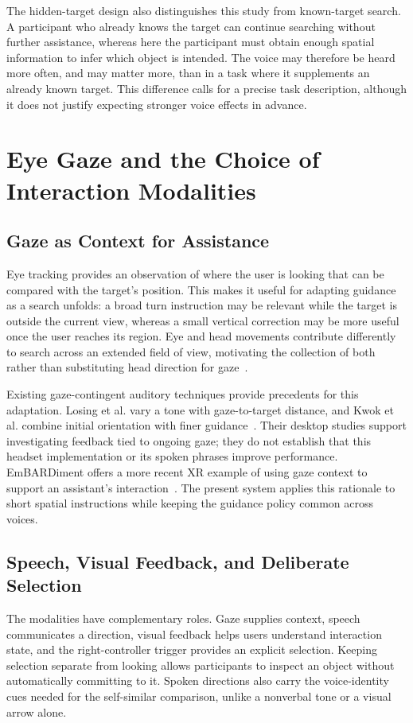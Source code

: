 The hidden-target design also distinguishes this study from known-target search. A participant who already knows the target can continue searching without further assistance, whereas here the participant must obtain enough spatial information to infer which object is intended. The voice may therefore be heard more often, and may matter more, than in a task where it supplements an already known target. This difference calls for a precise task description, although it does not justify expecting stronger voice effects in advance.

\section{Eye Gaze and the Choice of Interaction Modalities}
\subsection{Gaze as Context for Assistance}
Eye tracking provides an observation of where the user is looking that can be compared with the target's position. This makes it useful for adapting guidance as a search unfolds: a broad turn instruction may be relevant while the target is outside the current view, whereas a small vertical correction may be more useful once the user reaches its region. Eye and head movements contribute differently to search across an extended field of view, motivating the collection of both rather than substituting head direction for gaze~\cite{stein2024eyehead}.

Existing gaze-contingent auditory techniques provide precedents for this adaptation. Losing et al. vary a tone with gaze-to-target distance, and Kwok et al. combine initial orientation with finer guidance~\cite{losing2014guiding,kwok2022twostep}. Their desktop studies support investigating feedback tied to ongoing gaze; they do not establish that this headset implementation or its spoken phrases improve performance. EmBARDiment offers a more recent XR example of using gaze context to support an assistant's interaction~\cite{bovo2025embardiment}. The present system applies this rationale to short spatial instructions while keeping the guidance policy common across voices.

\subsection{Speech, Visual Feedback, and Deliberate Selection}
The modalities have complementary roles. Gaze supplies context, speech communicates a direction, visual feedback helps users understand interaction state, and the right-controller trigger provides an explicit selection. Keeping selection separate from looking allows participants to inspect an object without automatically committing to it. Spoken directions also carry the voice-identity cues needed for the self-similar comparison, unlike a nonverbal tone or a visual arrow alone.

